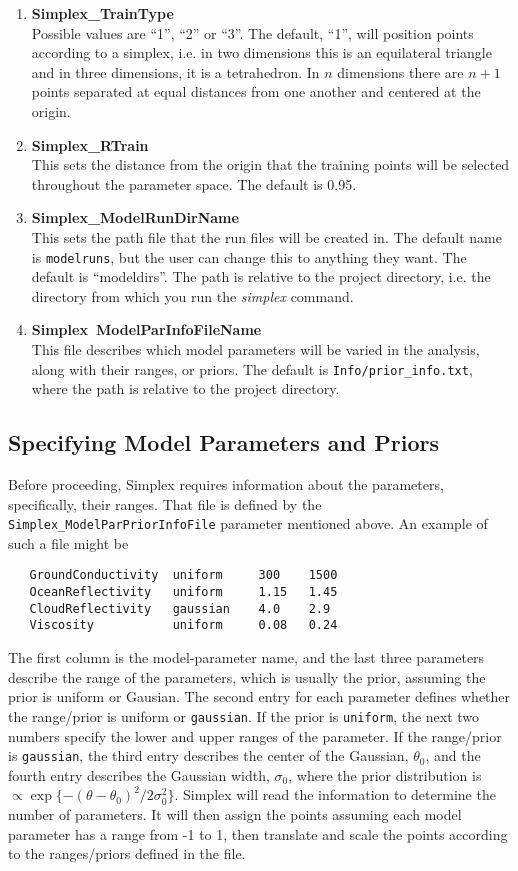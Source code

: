 \documentclass[main.tex]{subfiles}
\begin{document}
\begin{enumerate}\itemsep 0pt
    \item {\bf Simplex\_TrainType}\\
Possible values are ``1'', ``2'' or ``3''. The default, ``1'', will position points according to a simplex, i.e. in two dimensions this is an equilateral triangle and in three dimensions, it is a tetrahedron. In $n$ dimensions there are $n+1$ points separated at equal distances from one another and centered at the origin. 
\item {\bf Simplex\_RTrain}\\
This sets the distance from the origin that the training points will be selected throughout the parameter space. The default is 0.95.
\item {\bf Simplex\_ModelRunDirName}\\
This sets the path file that the run files will be created in. The default name is {\tt{modelruns}}, but the user can change this to anything they want. The default is ``modeldirs''. The path is relative to the project directory, i.e. the directory from which you run the {\it simplex} command.
\item {\bf Simplex\ ModelParInfoFileName}\\
This file describes which model parameters will be varied in the analysis, along with their ranges, or priors. The default is {\tt Info/prior\_info.txt}, where the path is relative to the project directory.
\end{enumerate}

\subsection{Specifying Model Parameters and Priors}

Before proceeding, Simplex requires information about the parameters, specifically, their ranges. That file is defined by the {\tt Simplex\_ModelParPriorInfoFile} parameter mentioned above. An example of such a file might be
{\tt\begin{verbatim}
   GroundConductivity  uniform     300    1500
   OceanReflectivity   uniform     1.15   1.45
   CloudReflectivity   gaussian    4.0    2.9
   Viscosity           uniform     0.08   0.24
\end{verbatim}
}
The first column is the model-parameter name, and the last three parameters describe the range of the parameters, which is usually the prior, assuming the prior is uniform or Gausian. The second entry for each parameter defines whether the range/prior is uniform or {\tt gaussian}. If the prior is {\tt uniform}, the next two numbers specify the lower and upper ranges of the parameter. If the range/prior is {\tt gaussian}, the third entry describes the center of the Gaussian, $\theta_0$, and the fourth entry describes the Gaussian width, $\sigma_0$, where the prior distribution is $\propto \exp\{-(\theta-\theta_0)^2/2\sigma_0^2\}$. Simplex will read the information to determine the number of parameters. It will then assign the points assuming each model parameter has a range from -1 to 1, then translate and scale the points according to the ranges/priors defined in the file.
\end{document}
